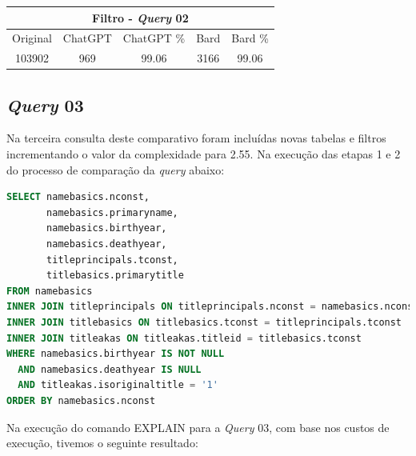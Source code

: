 \documentclass[12pt]{article}
\begin{document}
\begin{center}
\begin{tabular}{ |c|c|c|c|c| } 
 \hline
 \multicolumn{5}{|c|}{Filtro - \emph{Query} 02} \\
 \hline
 Original & ChatGPT & ChatGPT \% & Bard & Bard \% \\ [0.5ex] 
 \hline
 103902 & 969 & 99.06 & 3166 & 99.06 \\ 
 \hline
\end{tabular}
\end{center}

\subsection{\emph{Query} 03}

Na terceira consulta deste comparativo foram incluídas novas tabelas e filtros incrementando o valor da complexidade para 2.55. Na execução das etapas 1 e 2 do processo de comparação da \emph{query} abaixo:

\begin{lstlisting}[language=SQL, caption=Query 03]
SELECT namebasics.nconst,
       namebasics.primaryname,
       namebasics.birthyear,
       namebasics.deathyear,
       titleprincipals.tconst,
       titlebasics.primarytitle
FROM namebasics
INNER JOIN titleprincipals ON titleprincipals.nconst = namebasics.nconst
INNER JOIN titlebasics ON titlebasics.tconst = titleprincipals.tconst
INNER JOIN titleakas ON titleakas.titleid = titlebasics.tconst
WHERE namebasics.birthyear IS NOT NULL
  AND namebasics.deathyear IS NULL
  AND titleakas.isoriginaltitle = '1'
ORDER BY namebasics.nconst
\end{lstlisting}

Na execução do comando EXPLAIN para a \emph{Query} 03, com base nos custos de execução, tivemos o seguinte resultado:
\end{document}
